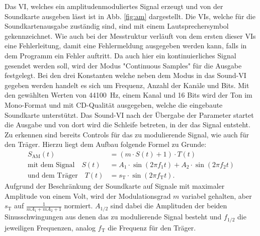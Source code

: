 		Das VI, welches ein amplitudenmoduliertes Signal erzeugt und von der Soundkarte ausgeben lässt ist in Abb. \ref{fig:am} dargestellt.
		Die VIs, welche für die Soundkartenausgabe zuständig sind, sind mit einem Lautsprechersymbol gekennzeichnet. 
		Wie auch bei der Messtruktur verläuft von dem ersten dieser VIs eine Fehlerleitung, damit eine Fehlermeldung ausgegeben werden kann, falls in dem Programm ein Fehler auftritt.
		Da auch hier ein kontinuierliches Signal gesendet werden soll, wird der Modus "Continuous Samples" für die Ausgabe festgelegt.
		Bei den drei Konstanten welche neben dem Modus in das Sound-VI gegeben werden handelt es sich um Frequenz, Anzahl der Kanäle und Bits.
		Mit den gewählten Werten von \SI{44100}{\hertz}, einem Kanal und 16 Bits wird der Ton im Mono-Format und mit CD-Qualität ausgegeben, welche die eingebaute Soundkarte unterstützt.
		Das Sound-VI nach der Übergabe der Parameter startet die Ausgabe und von dort wird die Schleife betreten, in der das Signal entsteht.
		Zu erkennen sind bereits Controls für das zu modulierende Signal, wie auch für den Träger.
		Hierzu liegt dem Aufbau folgende Formel zu Grunde:
		\begin{align}
			\label{eq:AM1} S_\text{AM}(t) &= (m \cdot S(t) + 1) \cdot T(t) \\
			\label{eq:AM2} \text{mit dem Signal} \quad S(t) &= A_1 \cdot \sin{(2\pi f_1 t)} + A_2 \cdot \sin{(2\pi f_2 t)}\\
			\label{eq:AM3} \text{und dem Träger} \quad T(t) &= s_\text{T} \cdot \sin{(2\pi f_\text{T} t)}.
		\end{align} 
		Aufgrund der Beschränkung der Soundkarte auf Signale mit maximaler Amplitude von einem Volt, wird der Modulationsgrad $m$ variabel gehalten, aber $s_\text{T}$ auf $\frac{1}{mA_1 + mA_2 + 1}$ normiert. 
		$A_{1/2}$ sind dabei die Amplituden der beiden Sinusschwingungen aus denen das zu modulierende Signal besteht und $f_{1/2}$ die jeweiligen Frequenzen, analog $f_\text{T}$ die Frequenz für den Träger.
		
